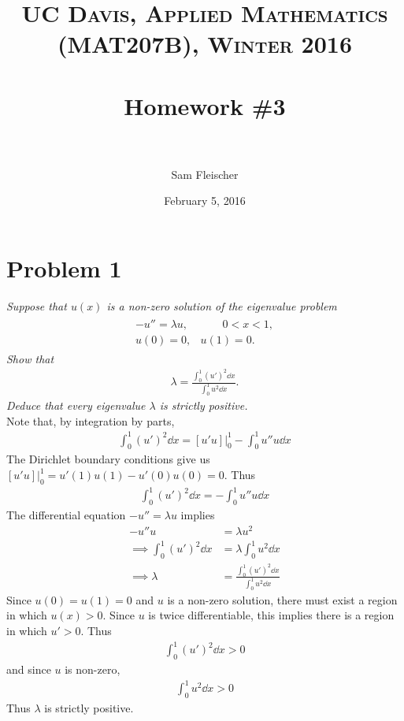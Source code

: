 \documentclass[paper=a4, fontsize=11pt]{scrartcl} %
\title{	
\normalfont \normalsize 
\textsc{UC Davis, Applied Mathematics (MAT207B), Winter 2016} \\ [25pt] %
\horrule{2pt} \\[0.4cm] %
\Huge Homework \#3 \\ %
\horrule{2pt} \\[0.5cm] %
}
\author{\huge Sam Fleischer} %
\date{February 5, 2016} %
\theoremstyle{plain}
\numberwithin{equation}{section} %
\numberwithin{figure}{section} %
\numberwithin{table}{section} %
\begin{document}
\thispagestyle{empty}

\maketitle %

\makeatletter
{}
\makeatother

\pagebreak

\section{Problem 1}
\emph{Suppose that $u(x)$ is a non-zero solution of the eigenvalue problem}
\begin{align*}
    \begin{array}{rr}
        -u'' = \lambda u, &\qquad 0 < x < 1,\\
        u(0) = 0, & u(1) = 0.
    \end{array}
\end{align*}
\emph{Show that}
\begin{align*}
    \lambda = \frac{\int_0^1 (u')^2 \dd x}{\int_0^1 u^2 \dd x}.
\end{align*}
\emph{Deduce that every eigenvalue $\lambda$ is strictly positive.} \\

Note that, by integration by parts,
\begin{align*}
    \int_0^1 (u')^2\dd x = [u' u]\Big|_0^1 - \int_0^1 u'' u \dd x
\end{align*}
The Dirichlet boundary conditions give us $[u' u]\Big|_0^1 = u'(1)u(1) - u'(0)u(0) = 0$.  Thus
\begin{align*}
    \int_0^1 (u')^2 \dd x = -\int_0^1 u'' u \dd x
\end{align*}
The differential equation $-u'' = \lambda u$ implies
\begin{align*}
    -u'' u &= \lambda u^2 \\
    \implies \int_0^1 (u')^2 \dd x &= \lambda \int_0^1 u^2 \dd x \\
    \implies \lambda &= \frac{\int_0^1(u')^2 \dd x}{\int_0^1 u^2 \dd x}
\end{align*}
Since $u(0) = u(1) = 0$ and $u$ is a non-zero solution, there must exist a region in which $u(x) > 0$.  Since $u$ is twice differentiable, this implies there is a region in which $u' > 0$.  Thus
\begin{align*}
    \int_0^1 (u')^2 \dd x > 0
\end{align*}
and since $u$ is non-zero,
\begin{align*}
    \int_0^1 u^2 \dd x > 0
\end{align*}
Thus $\lambda$ is strictly positive.
\end{document}
